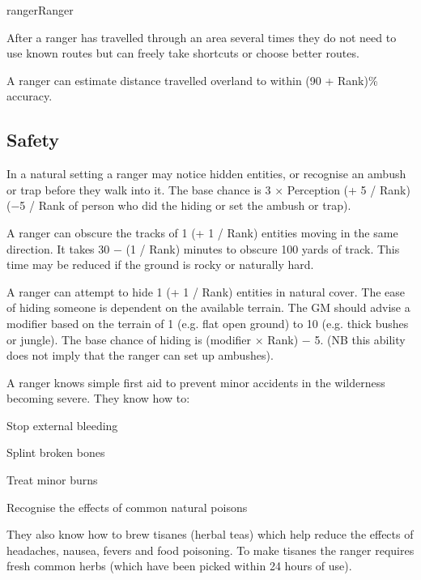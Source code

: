 \begin{Skill}[2.1]{ranger}{Ranger}
\begin{Description}
  After a ranger has travelled through an area several times they do
  not need to use known routes but can freely take shortcuts or choose
  better routes.

\item[Distance Estimates] A ranger can estimate distance travelled
  overland to within (90 + Rank)\% accuracy.

\end{Description}

\subsection{Safety}

\begin{Description}
\item[Detect Hidden] In a natural setting a ranger may notice hidden
  entities, or recognise an ambush or trap before they walk into
  it.  The base chance is 3 × Perception (+ 5 / Rank) (−5 / Rank of
  person who did the hiding or set the ambush or trap).

\item[Hide Tracks] A ranger can obscure the tracks of 1 (+ 1 / Rank)
  entities moving in the same direction.  It takes 30 − (1 / Rank)
  minutes to obscure 100 yards of track.  This time may be reduced if
  the ground is rocky or naturally hard.

\item[Hide Entities] A ranger can attempt to hide 1 (+ 1 / Rank)
  entities in natural cover. The ease of hiding someone is dependent
  on the available terrain. The GM should advise a modifier based on
  the terrain of 1 (e.g. flat open ground) to 10 (e.g. thick bushes or
  jungle). The base chance of hiding is (modifier × Rank) − 5. (NB
  this ability does not imply that the ranger can set up ambushes).

\item[First Aid] A ranger knows simple first aid to prevent minor
  accidents in the wilderness becoming severe. They know how to:
\begin{Itemize}
\item Stop external bleeding  
\item Splint broken bones  
\item Treat minor burns  
\item Recognise the effects of common natural poisons 
\end{Itemize}

They also know how to brew tisanes (herbal teas) which help reduce the
effects of headaches, nausea, fevers and food poisoning.  To make
tisanes the ranger requires fresh common herbs (which have been picked
within 24 hours of use).


\end{Description}
\end{Skill}
